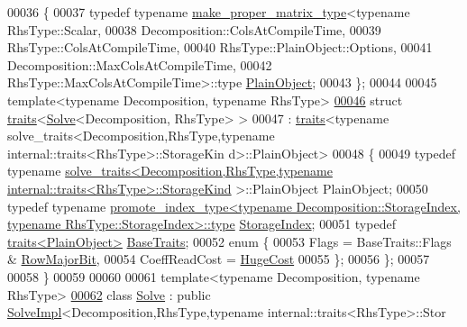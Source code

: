 \begin{DoxyCode}
00036 \{
00037   \textcolor{keyword}{typedef} \textcolor{keyword}{typename} \hyperlink{class_eigen_1_1internal_1_1make__proper__matrix__type}{make\_proper\_matrix\_type}<\textcolor{keyword}{typename} RhsType::Scalar,
00038                  Decomposition::ColsAtCompileTime,
00039                  RhsType::ColsAtCompileTime,
00040                  RhsType::PlainObject::Options,
00041                  Decomposition::MaxColsAtCompileTime,
00042                  RhsType::MaxColsAtCompileTime>::type \hyperlink{group___core___module_class_eigen_1_1_matrix}{PlainObject};
00043 \};
00044 
00045 \textcolor{keyword}{template}<\textcolor{keyword}{typename} Decomposition, \textcolor{keyword}{typename} RhsType>
\hyperlink{struct_eigen_1_1internal_1_1traits_3_01_solve_3_01_decomposition_00_01_rhs_type_01_4_01_4}{00046} \textcolor{keyword}{struct }\hyperlink{struct_eigen_1_1internal_1_1traits}{traits}<\hyperlink{group___core___module_class_eigen_1_1_solve}{Solve}<Decomposition, RhsType> >
00047   : \hyperlink{struct_eigen_1_1internal_1_1traits}{traits}<typename solve\_traits<Decomposition,RhsType,typename internal::traits<RhsType>::StorageKin
      d>::PlainObject>
00048 \{
00049   \textcolor{keyword}{typedef} \textcolor{keyword}{typename} 
      \hyperlink{struct_eigen_1_1internal_1_1solve__traits}{solve\_traits<Decomposition,RhsType,typename internal::traits<RhsType>::StorageKind}
      >::PlainObject PlainObject;
00050   \textcolor{keyword}{typedef} \textcolor{keyword}{typename} 
      \hyperlink{struct_eigen_1_1internal_1_1conditional}{promote\_index\_type<typename Decomposition::StorageIndex, typename RhsType::StorageIndex>::type}
       \hyperlink{struct_eigen_1_1internal_1_1conditional}{StorageIndex};
00051   \textcolor{keyword}{typedef} \hyperlink{struct_eigen_1_1internal_1_1traits}{traits<PlainObject>} \hyperlink{struct_eigen_1_1internal_1_1traits}{BaseTraits};
00052   \textcolor{keyword}{enum} \{
00053     Flags = BaseTraits::Flags & \hyperlink{group__flags_gae4f56c2a60bbe4bd2e44c5b19cbe8762}{RowMajorBit},
00054     CoeffReadCost = \hyperlink{namespace_eigen_a3163430a1c13173faffde69016b48aaf}{HugeCost}
00055   \};
00056 \};
00057 
00058 \}
00059 
00060 
00061 \textcolor{keyword}{template}<\textcolor{keyword}{typename} Decomposition, \textcolor{keyword}{typename} RhsType>
\hyperlink{group___core___module}{00062} \textcolor{keyword}{class }\hyperlink{group___core___module_class_eigen_1_1_solve}{Solve} : \textcolor{keyword}{public} \hyperlink{class_eigen_1_1_solve_impl}{SolveImpl}<Decomposition,RhsType,typename internal::traits<RhsType>::Stor

\end{DoxyCode}
